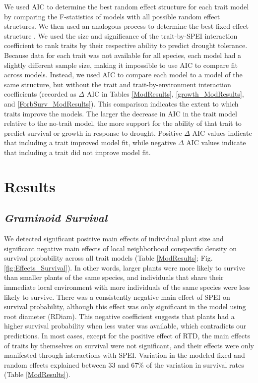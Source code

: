 \documentclass[12pt, letterpaper]{article}
\begin{document}
We used AIC to determine the best random effect structure for each trait model by comparing the F-statistics of models with all possible random effect structures. We then used an analogous process to determine the best fixed effect structure \citep{Bolker2009}. We used the size and significance of the trait-by-SPEI interaction coefficient to rank traits by their respective ability to predict drought tolerance. Because data for each trait was not available for all species, each model had a slightly different sample size, making it impossible to use AIC to compare fit across models. Instead, we used AIC to compare each model to a model of the same structure, but without the trait and trait-by-environment interaction coefficients  (recorded as $\Delta$ AIC in Tables \ref{ModResults}, \ref{growth_ModResults}, and \ref{ForbSurv_ModResults}). This comparison indicates the extent to which traits improve the models. The larger the decrease in AIC in the trait model relative to the no-trait model, the more support for the ability of that trait to predict survival or growth in response to drought. Positive $\Delta$ AIC values indicate that including a trait improved model fit, while negative $\Delta$ AIC values indicate that including a trait did not improve model fit.  


\section{Results}
\subsection{\textit{Graminoid Survival}} 
We detected significant positive main effects of individual plant size and significant negative main effects of local neighborhood conspecific density on survival probability across all trait models (Table \ref{ModResults}; Fig. \ref{fig:Effects_Survival}). In other words, larger plants were more likely to survive than smaller plants of the same species, and individuals that share their immediate local environment with more individuals of the same species were less likely to survive. There was a consistently negative main effect of SPEI on survival probability, although this effect was only significant in the model using root diameter (RDiam). This negative coefficient suggests that plants had a higher survival probability when less water was available, which contradicts our predictions. In most cases, except for the positive effect of RTD, the main effects of traits by themselves on survival were not significant, and their effects were only manifested through interactions with SPEI. Variation in the modeled fixed and random effects explained between 33 and 67\% of the variation in survival rates (Table \ref{ModResults}).
\end{document}
